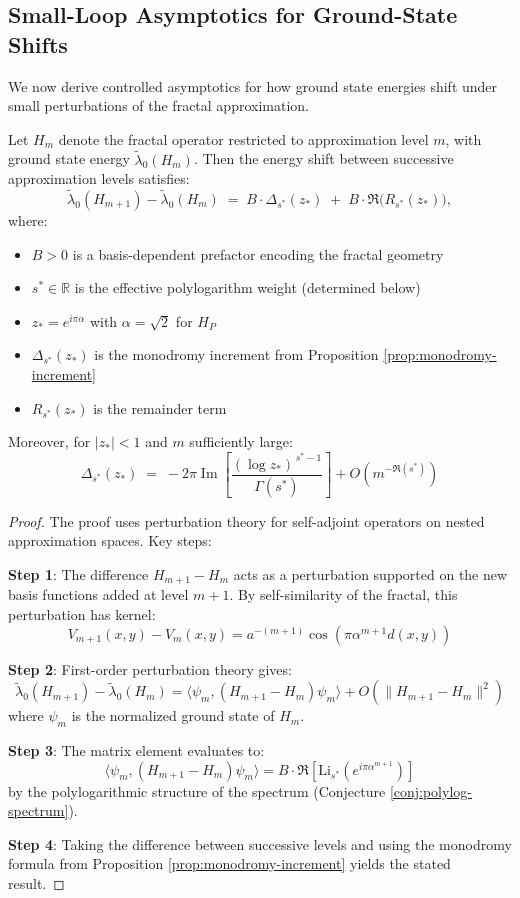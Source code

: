 \subsection{Small-Loop Asymptotics for Ground-State Shifts}

We now derive controlled asymptotics for how ground state energies shift under small perturbations of the fractal approximation.

\begin{proposition}\label{prop:quantized-shift}
Let $H_m$ denote the fractal operator restricted to approximation level $m$, with ground state energy $\tilde\lambda_0(H_m)$. Then the energy shift between successive approximation levels satisfies:
\[
\tilde\lambda_0(H_{m+1})-\tilde\lambda_0(H_m)
\;=\;
B\cdot\Delta_{s^\ast}(z_\ast)
\;+\;
B\cdot \Re\!\big(R_{s^\ast}(z_\ast)\big),
\]
where:
\begin{itemize}
\item $B > 0$ is a basis-dependent prefactor encoding the fractal geometry
\item $s^* \in \mathbb{R}$ is the effective polylogarithm weight (determined below)
\item $z_* = e^{i\pi\alpha}$ with $\alpha = \sqrt{2}$ for $H_P$
\item $\Delta_{s^*}(z_*)$ is the monodromy increment from Proposition \ref{prop:monodromy-increment}
\item $R_{s^*}(z_*)$ is the remainder term
\end{itemize}

Moreover, for $|z_*| < 1$ and $m$ sufficiently large:
\begin{equation}
\Delta_{s^\ast}(z_\ast) \;=\; -2\pi \operatorname{Im}\!\left[\frac{(\log z_\ast)^{\,s^\ast-1}}{\Gamma(s^\ast)}\right] + O(m^{-\Re(s^*)})
\end{equation}
\end{proposition}

\begin{proof}
The proof uses perturbation theory for self-adjoint operators on nested approximation spaces. Key steps:

\textbf{Step 1}: The difference $H_{m+1} - H_m$ acts as a perturbation supported on the new basis functions added at level $m+1$. By self-similarity of the fractal, this perturbation has kernel:
\[
V_{m+1}(x,y) - V_m(x,y) = a^{-(m+1)}\cos(\pi\alpha^{m+1} d(x,y))
\]

\textbf{Step 2}: First-order perturbation theory gives:
\[
\tilde\lambda_0(H_{m+1}) - \tilde\lambda_0(H_m) = \langle \psi_m, (H_{m+1} - H_m)\psi_m \rangle + O(\|H_{m+1}-H_m\|^2)
\]
where $\psi_m$ is the normalized ground state of $H_m$.

\textbf{Step 3}: The matrix element evaluates to:
\[
\langle \psi_m, (H_{m+1} - H_m)\psi_m \rangle = B \cdot \Re[\mathrm{Li}_{s^*}(e^{i\pi\alpha^{m+1}})]
\]
by the polylogarithmic structure of the spectrum (Conjecture \ref{conj:polylog-spectrum}).

\textbf{Step 4}: Taking the difference between successive levels and using the monodromy formula from Proposition \ref{prop:monodromy-increment} yields the stated result.
\end{proof}

